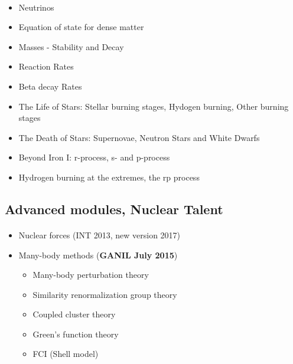 \documentclass[%
twoside,                 %
final,                   %
10pt]{article}
\begin{document}
\paragraph{}
\begin{itemize}
\item Neutrinos

\item Equation of state for dense matter

\item Masses - Stability and Decay

\item Reaction Rates

\item Beta decay Rates	

\item The Life of Stars: Stellar burning stages, Hydogen burning, Other burning stages

\item The Death of Stars: Supernovae, Neutron Stars and White Dwarfs

\item Beyond Iron I: r-process, s- and p-process

\item Hydrogen burning at the extremes, the rp process
\end{itemize}

\noindent




\subsection*{Advanced  modules, Nuclear Talent}

\paragraph{}
\begin{itemize}
\item Nuclear forces (INT 2013, new version 2017)

\item Many-body methods (\textbf{GANIL July 2015})
\begin{itemize}

  \item Many-body perturbation theory

  \item Similarity renormalization group theory

  \item Coupled cluster theory

  \item Green's function theory

  \item FCI (Shell model)
\end{itemize}

\noindent
\end{itemize}
\end{document}
